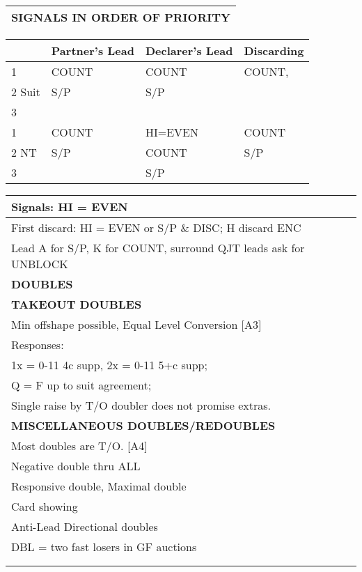 \documentclass{article}
\begin{document}
\begin{minipage}{90mm}
\begin{tabular}{| p{88mm} |}
		\cellcolor{orange!25}\textbf{SIGNALS IN ORDER OF PRIORITY} \\ \hline
	\end{tabular}
	\begin{tabular}{| p{8.9mm} | p{22mm} | p{22mm} | p{22mm} |}
		& Partner's Lead & Declarer's Lead & Discarding \\ \hline
		1 & COUNT & COUNT & COUNT, \\ \hline
		2 Suit & S/P & S/P& \\ \hline
		3 & & & \\ \hline
		1 & COUNT & HI=EVEN & COUNT \\ \hline
		2 NT & S/P & COUNT & S/P \\ \hline
		3 & & S/P & \\ \hline
	\end{tabular}
	\begin{tabular}{| p{88mm} |}
		Signals: HI = EVEN\\ \hline
		First discard: HI = EVEN or S/P \& DISC; H discard ENC\\ \hline
		Lead A for S/P, K for COUNT, surround QJT leads ask for UNBLOCK\\ \hline \hline
		\cellcolor{green!25} \textbf{DOUBLES} \\ \hline
		\cellcolor{orange!25}\textbf{TAKEOUT DOUBLES} \\ \hline
		Min offshape possible, Equal Level Conversion [A3]\\ \hline
		Responses:\\ \hline
		1x = 0-11 4c supp, 2x = 0-11 5+c supp;\\ \hline
		Q = F up to suit agreement;\\ \hline
		Single raise by T/O doubler does not promise extras.\\ \hline
		\cellcolor{orange!25}\textbf{MISCELLANEOUS DOUBLES/REDOUBLES} \\ \hline
		Most doubles are T/O. [A4]\\ \hline
		Negative double thru ALL\\ \hline
		Responsive double, Maximal double\\ \hline
		Card showing\\ \hline
		Anti-Lead Directional doubles\\ \hline
		DBL = two fast losers in GF auctions\\ \hline
		\\ \hline
		\\ \hline
	\end{tabular}
\end{minipage}
\end{document}
